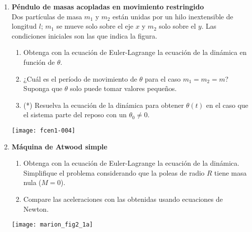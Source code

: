 \documentclass[11pt,spanish,a4paper]{article}
\begin{document}
\begin{enumerate}
\item 
\begin{minipage}[t][4cm]{0.7\textwidth}
\textbf{Péndulo de masas acopladas en movimiento restringido}\\ 
Dos partículas de masa \(m_1\) y \(m_2\) están unidas por un hilo inextensible de longitud \(l\); \(m_1\) se mueve solo sobre el eje \(x\) y \(m_2\) solo sobre el \(y\).
Las condiciones iniciales son las que indica la figura.
\begin{enumerate}
	\item Obtenga con la ecuación de Euler-Lagrange la ecuación de la dinámica en función de \(\theta\).
	\item ¿Cuál es el período de movimiento de \(\theta\) para el caso \(m_1 = m_2 = m\)?
	Suponga que \(\theta\) solo puede tomar valores pequeños.
	\item (*) Resuelva la ecuación de la dinámica para obtener \(\theta(t)\) en el caso que el sistema parte del reposo con un \(\theta_0 \neq 0\).
\end{enumerate}
\end{minipage}
\begin{minipage}[c][0cm][t]{0.3\textwidth}
	\hspace{0.5cm}
   \texttt{[image: fcen1-004]}
\end{minipage}



%


\item 
\begin{minipage}[t][4.5cm]{0.6\textwidth}
\textbf{Máquina de Atwood simple}\\
\begin{enumerate}
	\item Obtenga con la ecuación de Euler-Lagrange la ecuación de la dinámica.
	Simplifique el problema considerando que la poleas de radio \(R\) tiene masa nula (\(M=0\)).
	\item Compare las aceleraciones con las obtenidas usando ecuaciones de Newton.
\end{enumerate}
\end{minipage}
\begin{minipage}[c][3.5cm][t]{0.4\textwidth}
	\hspace{0.5cm}
	\texttt{[image: marion\_fig2\_1a]}
\end{minipage}




\end{enumerate}
\end{document}
